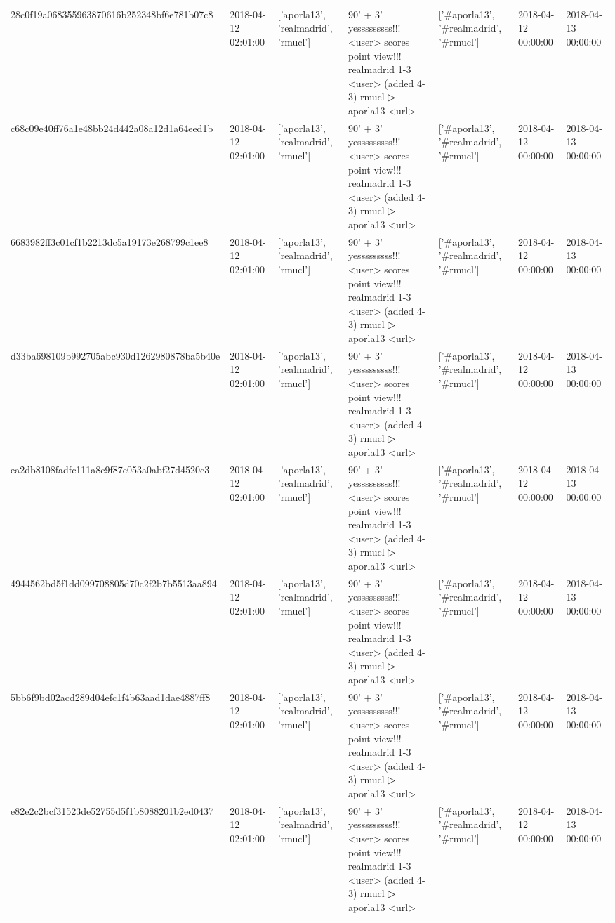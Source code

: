 \begin{tabular}{lllllll}
28c0f19a068355963870616b252348bf6e781b07c8 & 2018-04-12 02:01:00 & ['aporla13', 'realmadrid', 'rmucl'] & 90' + 3' yesssssssss!!! <user> scores point view!!! realmadrid 1-3 <user> (added 4-3) rmucl ▷ aporla13 <url> & ['#aporla13', '#realmadrid', '#rmucl'] & 2018-04-12 00:00:00 & 2018-04-13 00:00:00 \\
c68c09e40ff76a1e48bb24d442a08a12d1a64eed1b & 2018-04-12 02:01:00 & ['aporla13', 'realmadrid', 'rmucl'] & 90' + 3' yesssssssss!!! <user> scores point view!!! realmadrid 1-3 <user> (added 4-3) rmucl ▷ aporla13 <url> & ['#aporla13', '#realmadrid', '#rmucl'] & 2018-04-12 00:00:00 & 2018-04-13 00:00:00 \\
6683982ff3c01cf1b2213dc5a19173e268799c1ee8 & 2018-04-12 02:01:00 & ['aporla13', 'realmadrid', 'rmucl'] & 90' + 3' yesssssssss!!! <user> scores point view!!! realmadrid 1-3 <user> (added 4-3) rmucl ▷ aporla13 <url> & ['#aporla13', '#realmadrid', '#rmucl'] & 2018-04-12 00:00:00 & 2018-04-13 00:00:00 \\
d33ba698109b992705abc930d1262980878ba5b40e & 2018-04-12 02:01:00 & ['aporla13', 'realmadrid', 'rmucl'] & 90' + 3' yesssssssss!!! <user> scores point view!!! realmadrid 1-3 <user> (added 4-3) rmucl ▷ aporla13 <url> & ['#aporla13', '#realmadrid', '#rmucl'] & 2018-04-12 00:00:00 & 2018-04-13 00:00:00 \\
ea2db8108fadfc111a8c9f87e053a0abf27d4520c3 & 2018-04-12 02:01:00 & ['aporla13', 'realmadrid', 'rmucl'] & 90' + 3' yesssssssss!!! <user> scores point view!!! realmadrid 1-3 <user> (added 4-3) rmucl ▷ aporla13 <url> & ['#aporla13', '#realmadrid', '#rmucl'] & 2018-04-12 00:00:00 & 2018-04-13 00:00:00 \\
4944562bd5f1dd099708805d70c2f2b7b5513aa894 & 2018-04-12 02:01:00 & ['aporla13', 'realmadrid', 'rmucl'] & 90' + 3' yesssssssss!!! <user> scores point view!!! realmadrid 1-3 <user> (added 4-3) rmucl ▷ aporla13 <url> & ['#aporla13', '#realmadrid', '#rmucl'] & 2018-04-12 00:00:00 & 2018-04-13 00:00:00 \\
5bb6f9bd02acd289d04efc1f4b63aad1dae4887ff8 & 2018-04-12 02:01:00 & ['aporla13', 'realmadrid', 'rmucl'] & 90' + 3' yesssssssss!!! <user> scores point view!!! realmadrid 1-3 <user> (added 4-3) rmucl ▷ aporla13 <url> & ['#aporla13', '#realmadrid', '#rmucl'] & 2018-04-12 00:00:00 & 2018-04-13 00:00:00 \\
e82e2c2bcf31523de52755d5f1b8088201b2ed0437 & 2018-04-12 02:01:00 & ['aporla13', 'realmadrid', 'rmucl'] & 90' + 3' yesssssssss!!! <user> scores point view!!! realmadrid 1-3 <user> (added 4-3) rmucl ▷ aporla13 <url> & ['#aporla13', '#realmadrid', '#rmucl'] & 2018-04-12 00:00:00 & 2018-04-13 00:00:00 \\

\end{tabular}
